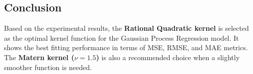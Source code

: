 \documentclass[11pt]{article}
\begin{document}
\subsection{Conclusion}

Based on the experimental results, the \textbf{Rational Quadratic kernel} is selected as the optimal kernel function for the Gaussian Process Regression model. It shows the best fitting performance in terms of MSE, RMSE, and MAE metrics. The \textbf{Matern kernel ($\nu=1.5$)} is also a recommended choice when a slightly smoother function is needed.
\end{document}
